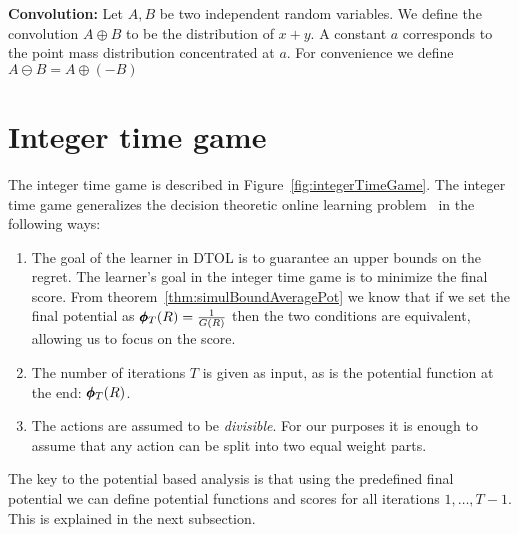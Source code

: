 \documentclass{article}[12pt]
\begin{document}
{\bf Convolution:} Let $A,B$ be two independent random variables. We define the
convolution $A \oplus B$ to be the distribution of $x+y$. A constant
$a$ corresponds to the point mass distribution concentrated at
$a$. For convenience we define $A \ominus B = A \oplus (-B)$


\section{Integer time game}
\label{sec:int-time-game}
The integer time game is described in
Figure~\ref{fig:integerTimeGame}.  The integer time game generalizes
the decision theoretic online learning problem~\cite{FreundSc97} in
the following ways:
\begin{enumerate}
\item The goal of the learner in DTOL is to guarantee an upper bounds
  on the regret. The learner's goal in the integer time game is to
  minimize the final score. From theorem~\ref{thm:simulBoundAveragePot} we know that if
  we set the final potential as $\pmb{\phi}_{T}(R) = \frac{1}{G(R)}$ then the two
  conditions are equivalent, allowing us to focus on the score.
\item The number of iterations $T$ is given as input, as is the
  potential function at the end: $\pmb{\phi}_{T}(R)$.
\item The actions are assumed to be {\em divisible}. For our purposes
it is enough to assume that any action can be split into two equal
weight parts.
\end{enumerate}

The key to the potential based analysis is that using the predefined
final potential we can define potential functions and scores for all
iterations $1,\ldots,T-1$. This is explained in the next subsection.
\end{document}
